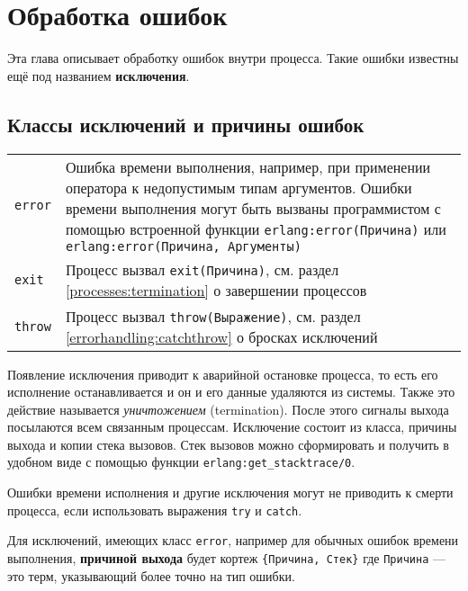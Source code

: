 \chapter{Обработка ошибок}
\label{errorhandling}

Эта глава описывает обработку ошибок внутри процесса. Такие ошибки известны ещё
под названием \textbf{исключения}.


\section{Классы исключений и причины ошибок}

\begin{center}
\begin{tabular}{|>{\raggedright}p{55pt}|>{\raggedright}p{350pt}|}
\hline
\multicolumn{2}{|p{326pt}|}{Классы исключений}\tabularnewline
\hline
\texttt{error} &
Ошибка времени выполнения, например, при применении оператора к недопустимым 
типам аргументов. Ошибки времени выполнения могут быть вызваны программистом с
помощью встроенной функции \texttt{erlang:error(Причина)} или 
\texttt{erlang:error(Причина, Аргументы)} \tabularnewline
\hline
\texttt{exit}  &
Процесс вызвал \texttt{exit(Причина)}, см. раздел \ref{processes:termination}
о завершении процессов \tabularnewline
\hline
\texttt{throw}  & 
Процесс вызвал \texttt{throw(Выражение)}, см. раздел 
\ref{errorhandling:catchthrow} о бросках исключений\tabularnewline
\hline
\end{tabular}
\end{center}

Появление исключения приводит к аварийной остановке процесса, то есть его 
исполнение останавливается и он и его данные удаляются из системы. Также это 
действие называется \emph{уничтожением} (termination). После этого сигналы 
выхода посылаются всем связанным процессам. Исключение состоит из класса, 
причины выхода и копии стека вызовов. Стек вызовов можно сформировать и 
получить в удобном виде с помощью функции \texttt{erlang:get\_stacktrace/0}.

Ошибки времени исполнения и другие исключения могут не приводить к смерти 
процесса, если использовать выражения \texttt{try} и \texttt{catch}.

Для исключений, имеющих класс \texttt{error}, например для обычных ошибок 
времени выполнения, \textbf{причиной выхода} будет кортеж \texttt{\{Причина, 
Стек\}} где \texttt{Причина} --- это терм, указывающий более точно на тип 
ошибки.

